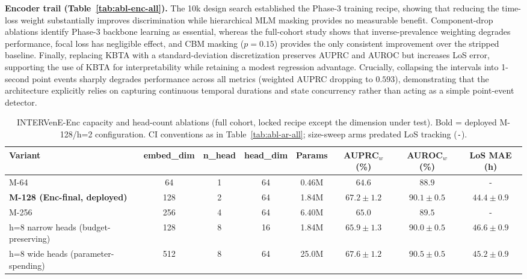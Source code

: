 \textbf{Encoder trail (Table~\ref{tab:abl-enc-all}).}
The 10k design search established the Phase-3 training recipe, showing that reducing the time-loss weight substantially improves discrimination while hierarchical MLM masking provides no measurable benefit. Component-drop ablations identify Phase-3 backbone learning as essential, whereas the full-cohort study shows that inverse-prevalence weighting degrades performance, focal loss has negligible effect, and CBM masking ($p{=}0.15$) provides the only consistent improvement over the stripped baseline. Finally, replacing KBTA with a standard-deviation discretization preserves AUPRC and AUROC but increases LoS error, supporting the use of KBTA for interpretability while retaining a modest regression advantage. Crucially, collapsing the intervals into 1-second point events sharply degrades performance across all metrics (weighted AUPRC dropping to $0.593$), demonstrating that the architecture explicitly relies on capturing continuous temporal durations and state concurrency rather than acting as a simple point-event detector.

\begin{table}[!t]
\caption{INTERVenE-Enc capacity and head-count ablations (full cohort, locked recipe except the dimension under test). Bold = deployed M-128/h=2 configuration. CI conventions as in Table~\ref{tab:abl-ar-all}; size-sweep arms predated LoS tracking (\texttt{-}).}
\label{tab:abl-enc-capacity}
\centering
\small
\setlength{\tabcolsep}{4pt}
\begin{tabular}{lccccccc}
\toprule
Variant & embed\_dim & n\_head & head\_dim & Params & AUPRC$_w$ (\%) & AUROC$_w$ (\%) & LoS MAE (h) \\
\midrule
M-64                                  & 64   & 1 & 64 & 0.46M & $64.6$                    & $88.9$                    & -                       \\
\textbf{M-128 (Enc-final, deployed)}  & 128  & 2 & 64 & 1.84M & $\mathbf{67.2 \pm 1.2}$ & $\mathbf{90.1 \pm 0.5}$ & $\mathbf{44.4 \pm 0.9}$ \\
M-256                                 & 256  & 4 & 64 & 6.40M & $65.0$                    & $89.5$                    & -                       \\
\midrule
h=8 narrow heads (budget-preserving)  & 128  & 8 & 16 & 1.84M & $65.9 \pm 1.3$          & $90.0 \pm 0.5$          & $46.6 \pm 0.9$          \\
h=8 wide heads (parameter-spending)   & 512  & 8 & 64 & 25.0M & $67.6 \pm 1.2$          & $90.5 \pm 0.5$          & $45.2 \pm 0.9$          \\
\bottomrule
\end{tabular}
\end{table}

